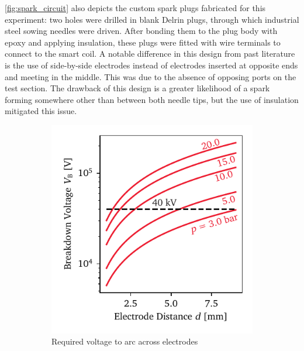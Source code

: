             \autoref{fig:spark_circuit} also depicts the custom spark plugs fabricated for this experiment: two holes were drilled in blank Delrin plugs, through which industrial steel sowing needles were driven. After bonding them to the plug body with epoxy and applying insulation, these plugs were fitted with wire terminals to connect to the smart coil. A notable difference in this design from past literature is the use of side-by-side electrodes instead of electrodes inserted at opposite ends and meeting in the middle. This was due to the absence of opposing ports on the test section. The drawback of this design is a greater likelihood of a spark forming somewhere other than between both needle tips, but the use of insulation mitigated this issue.

            \begin{figure}[h]
                \centering
                \begin{subfigure}[t]{0.47\textwidth}
                    \centering
                    \includegraphics[width=\textwidth]{assets/3 design/pressurePaschen_final.pdf}
                    \caption{Required voltage to arc across electrodes}
                    \label{fig:paschenPressure}
                \end{subfigure}
                \begin{subfigure}[t]{0.47\textwidth}

\end{subfigure}
\end{figure}
